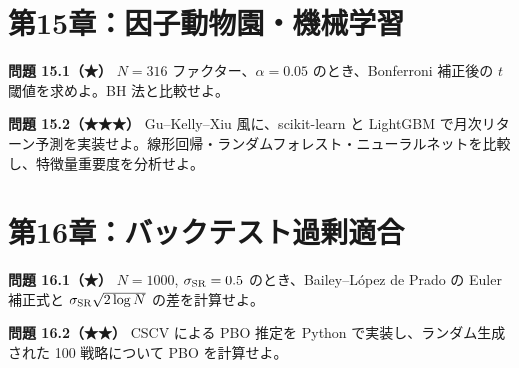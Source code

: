 \documentclass[11pt,a4paper]{report}
\begin{document}
\section{第15章：因子動物園・機械学習}

\textbf{問題 15.1（★）} $N = 316$ ファクター、$\alpha = 0.05$ のとき、Bonferroni 補正後の $t$ 閾値を求めよ。BH 法と比較せよ。

\textbf{問題 15.2（★★★）} Gu–Kelly–Xiu 風に、scikit-learn と LightGBM で月次リターン予測を実装せよ。線形回帰・ランダムフォレスト・ニューラルネットを比較し、特徴量重要度を分析せよ。

\section{第16章：バックテスト過剰適合}

\textbf{問題 16.1（★）} $N = 1000$, $\sigma_{\rm SR} = 0.5$ のとき、Bailey–López de Prado の Euler 補正式と $\sigma_{\rm SR}\sqrt{2 \log N}$ の差を計算せよ。

\textbf{問題 16.2（★★）} CSCV による PBO 推定を Python で実装し、ランダム生成された 100 戦略について PBO を計算せよ。

\noindent\hrulefill
\end{document}
